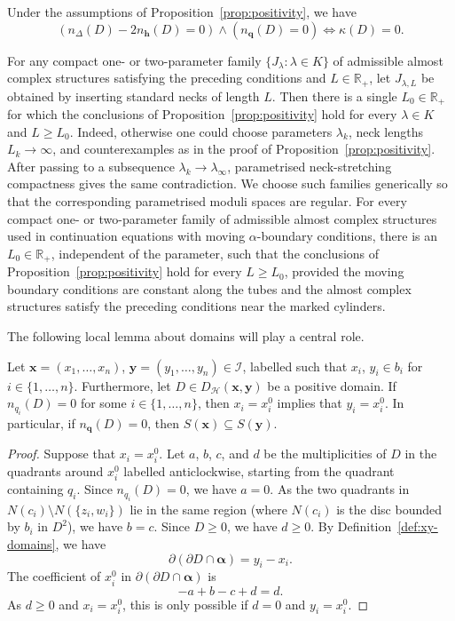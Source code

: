 \documentclass[11pt]{amsart}
\numberwithin{equation}{section}
\numberwithin{figure}{section}
\theoremstyle{definition}
\newcommand{\cH}{\mathcal{H}}
\newcommand{\cI}{\mathcal{I}}
\newcommand{\bR}{\mathbb{R}}
\newcommand{\as}{\boldsymbol{\alpha}}
\newcommand{\hs}{\boldsymbol{h}}
\newcommand{\qs}{\boldsymbol{q}}
\newcommand{\xs}{\boldsymbol{x}}
\newcommand{\ys}{\boldsymbol{y}}
\begin{document}
\begin{coro}
Under the assumptions of Proposition~\ref{prop:positivity}, we have 
\begin{equation}\label{eqn:kappa}
(n_{\Delta}(D) - 2n_{\hs}(D) = 0) \wedge (n_{\qs}(D) = 0) \iff \kappa(D) = 0.
\end{equation}
\end{coro}

\begin{rmk}\label{rem:parametrised-positivity}
    For any compact one- or two-parameter family $\{J_\lambda : \lambda \in K\}$ of admissible almost complex structures satisfying the preceding conditions and $L \in \bR_+$, let $J_{\lambda, L}$ be obtained by inserting standard necks of length $L$. Then there is a single $L_0 \in \bR_+$ for which the conclusions of Proposition~\ref{prop:positivity} hold for every $\lambda \in K$ and $L \ge L_0$. Indeed, otherwise one could choose parameters $\lambda_k$, neck lengths $L_k \to \infty$, and counterexamples as in the proof of Proposition~\ref{prop:positivity}. After passing to a subsequence $\lambda_k \to \lambda_\infty$, parametrised neck-stretching compactness gives the same contradiction. We choose such families generically so that the corresponding parametrised moduli spaces are regular. For every compact one- or two-parameter family of admissible almost complex structures used in continuation equations with moving $\alpha$-boundary conditions, there is an $L_0 \in \bR_+$, independent of the parameter, such that the conclusions of Proposition~\ref{prop:positivity} hold for every $L \geq L_0$, provided the moving boundary conditions are constant along the tubes and the almost complex structures satisfy the preceding conditions near the marked cylinders.
\end{rmk}

The following local lemma about domains will play a central role.

\begin{lem}\label{lem:S-monotonicity}
    Let $\xs = (x_1,\dots,x_n)$, $\ys = (y_1,\dots,y_n) \in \cI$, labelled such that $x_i$, $y_i \in b_i$ for $i \in \{1,\dots,n\}$. Furthermore, let $D \in D_\cH(\xs,\ys)$ be a positive domain. If $n_{q_i}(D) = 0$ for some $i \in \{1,\dots,n\}$, then $x_i = x_i^0$ implies that $y_i = x_i^0$. In particular, if $n_{\qs}(D) = 0$, then $S(\xs) \subseteq S(\ys)$.
\end{lem}

\begin{proof}
    Suppose that $x_i = x_i^0$. Let $a$, $b$, $c$, and $d$ be the multiplicities of $D$ in the quadrants around $x_i^0$ labelled anticlockwise, starting from the quadrant containing $q_i$. Since $n_{q_i}(D)=0$, we have $a = 0$. As the two quadrants in $N(c_i) \setminus N(\{z_i,w_i\})$ lie in the same region (where $N(c_i)$ is the disc bounded by $b_i$ in $D^2$), we have $b = c$. Since $D \ge 0$, we have $d \ge 0$. By Definition~\ref{def:xy-domains}, we have 
    \[
    \partial(\partial D \cap \as) = y_i - x_i.
    \]
    The coefficient of $x_i^0$ in $\partial(\partial D \cap \as)$ is
    \[
    -a + b - c + d = d.
    \]
    As $d \ge 0$ and $x_i = x_i^0$, this is only possible if $d = 0$ and $y_i = x_i^0$.
\end{proof}
\end{document}
